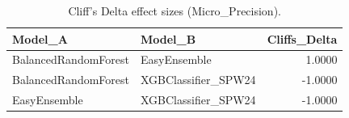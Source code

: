 \begin{table}[t]
\centering
\begin{tabular}{llr}
\toprule
Model_A & Model_B & Cliffs_Delta \\
\midrule
BalancedRandomForest & EasyEnsemble & 1.0000 \\
BalancedRandomForest & XGBClassifier_SPW24 & -1.0000 \\
EasyEnsemble & XGBClassifier_SPW24 & -1.0000 \\
\bottomrule
\end{tabular}
\caption{Cliff's Delta effect sizes (Micro_Precision).}
\label{tab:cliffs_Micro_Precision}
\end{table}